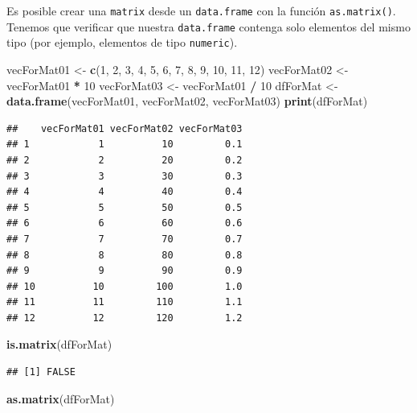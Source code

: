 \documentclass[]{book}
\newenvironment{Shaded}{\begin{snugshade}}{\end{snugshade}}
\newcommand{\KeywordTok}[1]{\textcolor[rgb]{0.13,0.29,0.53}{\textbf{#1}}}
\newcommand{\DecValTok}[1]{\textcolor[rgb]{0.00,0.00,0.81}{#1}}
\newcommand{\StringTok}[1]{\textcolor[rgb]{0.31,0.60,0.02}{#1}}
\newcommand{\OperatorTok}[1]{\textcolor[rgb]{0.81,0.36,0.00}{\textbf{#1}}}
\newcommand{\NormalTok}[1]{#1}
\begin{document}
Es posible crear una \texttt{matrix} desde un \texttt{data.frame} con la
función \texttt{as.matrix()}. Tenemos que verificar que nuestra
\texttt{data.frame} contenga solo elementos del mismo tipo (por ejemplo,
elementos de tipo \texttt{numeric}).

\begin{Shaded}
\begin{Highlighting}[]
\NormalTok{vecForMat01 <-}\StringTok{ }\KeywordTok{c}\NormalTok{(}\DecValTok{1}\NormalTok{, }\DecValTok{2}\NormalTok{, }\DecValTok{3}\NormalTok{, }\DecValTok{4}\NormalTok{, }\DecValTok{5}\NormalTok{, }\DecValTok{6}\NormalTok{, }\DecValTok{7}\NormalTok{, }\DecValTok{8}\NormalTok{, }\DecValTok{9}\NormalTok{, }\DecValTok{10}\NormalTok{, }\DecValTok{11}\NormalTok{, }\DecValTok{12}\NormalTok{)}
\NormalTok{vecForMat02 <-}\StringTok{ }\NormalTok{vecForMat01 }\OperatorTok{*}\StringTok{ }\DecValTok{10}
\NormalTok{vecForMat03 <-}\StringTok{ }\NormalTok{vecForMat01 }\OperatorTok{/}\StringTok{ }\DecValTok{10}
\NormalTok{dfForMat <-}\StringTok{ }\KeywordTok{data.frame}\NormalTok{(vecForMat01, vecForMat02, vecForMat03)}
\KeywordTok{print}\NormalTok{(dfForMat)}
\end{Highlighting}
\end{Shaded}

\begin{verbatim}
##    vecForMat01 vecForMat02 vecForMat03
## 1            1          10         0.1
## 2            2          20         0.2
## 3            3          30         0.3
## 4            4          40         0.4
## 5            5          50         0.5
## 6            6          60         0.6
## 7            7          70         0.7
## 8            8          80         0.8
## 9            9          90         0.9
## 10          10         100         1.0
## 11          11         110         1.1
## 12          12         120         1.2
\end{verbatim}

\begin{Shaded}
\begin{Highlighting}[]
\KeywordTok{is.matrix}\NormalTok{(dfForMat)}
\end{Highlighting}
\end{Shaded}

\begin{verbatim}
## [1] FALSE
\end{verbatim}

\begin{Shaded}
\begin{Highlighting}[]
\KeywordTok{as.matrix}\NormalTok{(dfForMat)}
\end{Highlighting}
\end{Shaded}
\end{document}
